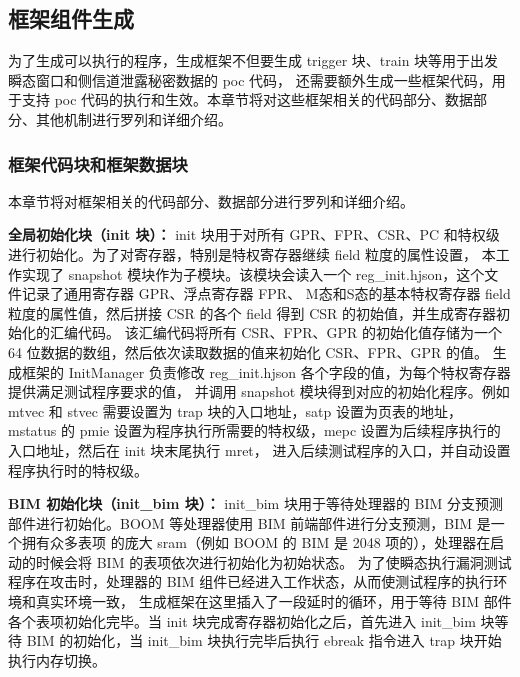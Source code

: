 \subsection{框架组件生成}

为了生成可以执行的程序，生成框架不但要生成 trigger 块、train 块等用于出发瞬态窗口和侧信道泄露秘密数据的 poc 代码，
还需要额外生成一些框架代码，用于支持 poc 代码的执行和生效。本章节将对这些框架相关的代码部分、数据部分、其他机制进行罗列和详细介绍。\par

\subsubsection{框架代码块和框架数据块}
本章节将对框架相关的代码部分、数据部分进行罗列和详细介绍。

\textbf{全局初始化块（init 块）：}
init 块用于对所有 GPR、FPR、CSR、PC 和特权级进行初始化。为了对寄存器，特别是特权寄存器继续 field 粒度的属性设置，
本工作实现了 snapshot 模块作为子模块。该模块会读入一个 reg\_init.hjson，这个文件记录了通用寄存器 GPR、浮点寄存器 FPR、
M态和S态的基本特权寄存器 field 粒度的属性值，然后拼接 CSR 的各个 field 得到 CSR 的初始值，并生成寄存器初始化的汇编代码。
该汇编代码将所有 CSR、FPR、GPR 的初始化值存储为一个 64 位数据的数组，然后依次读取数据的值来初始化 CSR、FPR、GPR 的值。
生成框架的 InitManager 负责修改 reg\_init.hjson 各个字段的值，为每个特权寄存器提供满足测试程序要求的值，
并调用 snapshot 模块得到对应的初始化程序。例如 mtvec 和 stvec 需要设置为 trap 块的入口地址，satp 设置为页表的地址，
mstatus 的 pmie 设置为程序执行所需要的特权级，mepc 设置为后续程序执行的入口地址，然后在 init 块末尾执行 mret，
进入后续测试程序的入口，并自动设置程序执行时的特权级。\par

\textbf{BIM 初始化块（init\_bim 块）：}
init\_bim 块用于等待处理器的 BIM 分支预测部件进行初始化。BOOM 等处理器使用 BIM 前端部件进行分支预测，BIM 是一个拥有众多表项
的庞大 sram（例如 BOOM 的 BIM 是 2048 项的），处理器在启动的时候会将 BIM 的表项依次进行初始化为初始状态。
为了使瞬态执行漏洞测试程序在攻击时，处理器的 BIM 组件已经进入工作状态，从而使测试程序的执行环境和真实环境一致，
生成框架在这里插入了一段延时的循环，用于等待 BIM 部件各个表项初始化完毕。当 init 块完成寄存器初始化之后，首先进入
init\_bim 块等待 BIM 的初始化，当 init\_bim 块执行完毕后执行 ebreak 指令进入 trap 块开始执行内存切换。\par

